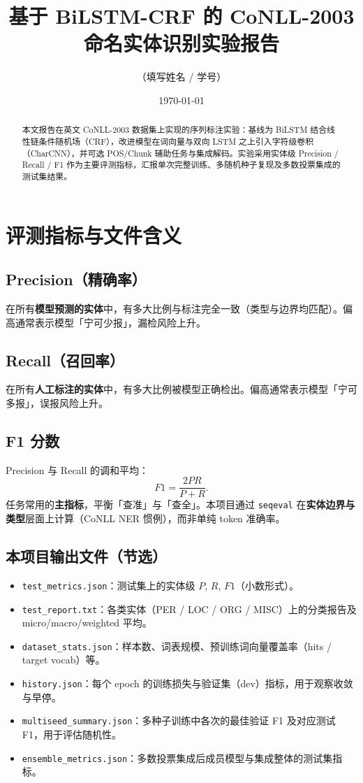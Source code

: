 \documentclass[UTF8,a4paper]{ctexart}
\title{基于 BiLSTM-CRF 的 CoNLL-2003 命名实体识别实验报告}
\author{（填写姓名 / 学号）}
\date{\today}
\begin{document}
\maketitle

\begin{abstract}
本文报告在英文 CoNLL-2003 数据集上实现的序列标注实验：基线为 BiLSTM 结合线性链条件随机场（CRF），改进模型在词向量与双向 LSTM 之上引入字符级卷积（CharCNN），并可选 POS/Chunk 辅助任务与集成解码。实验采用实体级 Precision / Recall / F1 作为主要评测指标，汇报单次完整训练、多随机种子复现及多数投票集成的测试集结果。
\end{abstract}

\section{评测指标与文件含义}

\subsection{Precision（精确率）}
在所有\textbf{模型预测的实体}中，有多大比例与标注完全一致（类型与边界均匹配）。偏高通常表示模型「宁可少报」，漏检风险上升。

\subsection{Recall（召回率）}
在所有\textbf{人工标注的实体}中，有多大比例被模型正确检出。偏高通常表示模型「宁可多报」，误报风险上升。

\subsection{F1 分数}
Precision 与 Recall 的调和平均：
\begin{equation}
  F1 = \frac{2PR}{P+R}.
\end{equation}
任务常用的\textbf{主指标}，平衡「查准」与「查全」。本项目通过 \texttt{seqeval} 在\textbf{实体边界与类型}层面上计算（CoNLL NER 惯例），而非单纯 token 准确率。

\subsection{本项目输出文件（节选）}
\begin{itemize}
  \item \texttt{test\_metrics.json}：测试集上的实体级 $P$, $R$, $F1$（小数形式）。
  \item \texttt{test\_report.txt}：各类实体（PER / LOC / ORG / MISC）上的分类报告及 micro/macro/weighted 平均。
  \item \texttt{dataset\_stats.json}：样本数、词表规模、预训练词向量覆盖率（hits / target vocab）等。
  \item \texttt{history.json}：每个 epoch 的训练损失与验证集（dev）指标，用于观察收敛与早停。
  \item \texttt{multiseed\_summary.json}：多种子训练中各次的最佳验证 F1 及对应测试 F1，用于评估随机性。
  \item \texttt{ensemble\_metrics.json}：多数投票集成后成员模型与集成整体的测试集指标。
\end{itemize}
\end{document}
